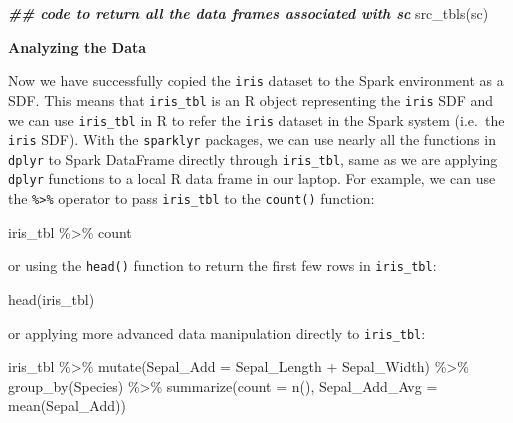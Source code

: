 \documentclass[
  12pt,
]{krantz}
\makeatletter
\newenvironment{Shaded}{\begin{snugshade}}{\end{snugshade}}
\newcommand{\AttributeTok}[1]{\textcolor[rgb]{0.61,0.61,0.61}{#1}}
\newcommand{\DocumentationTok}[1]{\textcolor[rgb]{0.37,0.37,0.37}{\textbf{\textit{#1}}}}
\newcommand{\FunctionTok}[1]{\textcolor[rgb]{0,0,0}{#1}}
\newcommand{\NormalTok}[1]{#1}
\newcommand{\SpecialCharTok}[1]{\textcolor[rgb]{0,0,0}{#1}}
\newenvironment{kframe}{%
\medskip{}
\setlength{\fboxsep}{.8em}
 \def\at@end@of@kframe{}%
 \ifinner\ifhmode%
  \def\at@end@of@kframe{\end{minipage}}%
  \begin{minipage}{\columnwidth}%
 \fi\fi%
 \def\FrameCommand##1{\hskip\@totalleftmargin \hskip-\fboxsep
 \colorbox{shadecolor}{##1}\hskip-\fboxsep
     \hskip-\linewidth \hskip-\@totalleftmargin \hskip\columnwidth}%
 \MakeFramed {\advance\hsize-\width
   \@totalleftmargin\z@ \linewidth\hsize
   \@setminipage}}%
 {\par\unskip\endMakeFramed%
 \at@end@of@kframe}
\renewenvironment{Shaded}{\begin{kframe}}{\end{kframe}}
\makeatother
\begin{document}
\begin{Shaded}
\begin{Highlighting}[]
\DocumentationTok{\#\# code to return all the data frames associated with sc}
\FunctionTok{src\_tbls}\NormalTok{(sc) }
\end{Highlighting}
\end{Shaded}

\textbf{Analyzing the Data}

Now we have successfully copied the \texttt{iris} dataset to the Spark environment as a SDF. This means that \texttt{iris\_tbl} is an R object representing the \texttt{iris} SDF and we can use \texttt{iris\_tbl} in R to refer the \texttt{iris} dataset in the Spark system (i.e.~the \texttt{iris} SDF). With the \texttt{sparklyr} packages, we can use nearly all the functions in \texttt{dplyr} to Spark DataFrame directly through \texttt{iris\_tbl}, same as we are applying \texttt{dplyr} functions to a local R data frame in our laptop. For example, we can use the \texttt{\%\textgreater{}\%} operator to pass \texttt{iris\_tbl} to the \texttt{count()} function:

\begin{Shaded}
\begin{Highlighting}[]
\NormalTok{iris\_tbl }\SpecialCharTok{\%\textgreater{}\%}\NormalTok{ count}
\end{Highlighting}
\end{Shaded}

or using the \texttt{head()} function to return the first few rows in \texttt{iris\_tbl}:

\begin{Shaded}
\begin{Highlighting}[]
\FunctionTok{head}\NormalTok{(iris\_tbl)}
\end{Highlighting}
\end{Shaded}

or applying more advanced data manipulation directly to \texttt{iris\_tbl}:

\begin{Shaded}
\begin{Highlighting}[]
\NormalTok{iris\_tbl }\SpecialCharTok{\%\textgreater{}\%}
    \FunctionTok{mutate}\NormalTok{(}\AttributeTok{Sepal\_Add =}\NormalTok{ Sepal\_Length }\SpecialCharTok{+}\NormalTok{ Sepal\_Width) }\SpecialCharTok{\%\textgreater{}\%}
    \FunctionTok{group\_by}\NormalTok{(Species) }\SpecialCharTok{\%\textgreater{}\%}
    \FunctionTok{summarize}\NormalTok{(}\AttributeTok{count =} \FunctionTok{n}\NormalTok{(), }\AttributeTok{Sepal\_Add\_Avg =} \FunctionTok{mean}\NormalTok{(Sepal\_Add))}
\end{Highlighting}
\end{Shaded}
\end{document}
